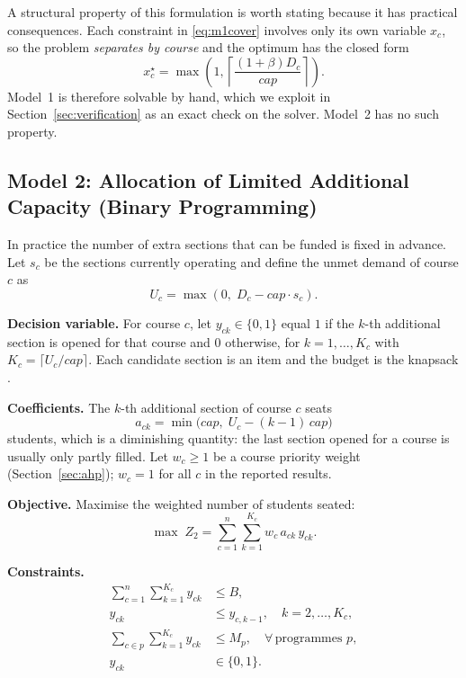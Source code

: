 \documentclass[conference]{IEEEtran}
\begin{document}
A structural property of this formulation is worth stating because it has practical
consequences. Each constraint in \eqref{eq:m1cover} involves only its own variable
$x_c$, so the problem \emph{separates by course} and the optimum has the closed form
\begin{equation}
x_c^{\star} = \max\!\left(1, \left\lceil \frac{(1+\beta) D_c}{cap} \right\rceil \right).
\label{eq:m1closed}
\end{equation}
Model~1 is therefore solvable by hand, which we exploit in
Section~\ref{sec:verification} as an exact check on the solver. Model~2 has no such
property.

\subsection{Model 2: Allocation of Limited Additional Capacity (Binary Programming)}

In practice the number of extra sections that can be funded is fixed in advance. Let
$s_c$ be the sections currently operating and define the unmet demand of course $c$ as
\begin{equation}
U_c = \max\!\left(0,\; D_c - cap \cdot s_c\right).
\end{equation}

\textbf{Decision variable.} For course $c$, let $y_{ck} \in \{0,1\}$ equal $1$ if the
$k$-th additional section is opened for that course and $0$ otherwise, for
$k = 1,\dots,K_c$ with $K_c = \lceil U_c / cap \rceil$. Each candidate section is an item
and the budget is the knapsack \cite{martello}.

\textbf{Coefficients.} The $k$-th additional section of course $c$ seats
\begin{equation}
a_{ck} = \min\!\big(cap,\; U_c - (k-1)\,cap\big)
\end{equation}
students, which is a diminishing quantity: the last section opened for a course is
usually only partly filled. Let $w_c \ge 1$ be a course priority weight
(Section~\ref{sec:ahp}); $w_c = 1$ for all $c$ in the reported results.

\textbf{Objective.} Maximise the weighted number of students seated:
\begin{equation}
\max \; Z_2 = \sum_{c=1}^{n} \sum_{k=1}^{K_c} w_c\, a_{ck}\, y_{ck}.
\label{eq:m2obj}
\end{equation}

\textbf{Constraints.}
\begin{align}
\sum_{c=1}^{n} \sum_{k=1}^{K_c} y_{ck} &\le B, \label{eq:m2budget}\\
y_{ck} &\le y_{c,k-1}, \quad k = 2,\dots,K_c, \label{eq:m2order}\\
\sum_{c \in p} \sum_{k=1}^{K_c} y_{ck} &\le M_p, \quad \forall\, \text{programmes } p,
\label{eq:m2fair}\\
y_{ck} &\in \{0,1\}. \label{eq:m2bin}
\end{align}
\end{document}
